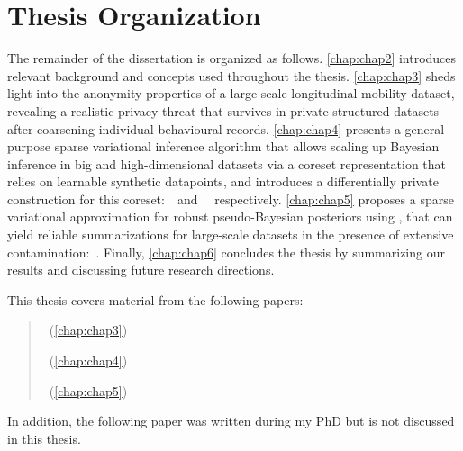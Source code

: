 \section{Thesis Organization}
\label{sec:thesis-organization}
The remainder of the dissertation is organized as follows. \cref{chap:chap2} introduces relevant background and concepts used throughout the thesis. \cref{chap:chap3} sheds light into the anonymity properties of a large-scale longitudinal mobility dataset, revealing a realistic privacy threat that survives in private structured datasets after coarsening individual behavioural records. \cref{chap:chap4} presents a general-purpose sparse variational inference algorithm that allows scaling up Bayesian inference in big and high-dimensional datasets via a coreset representation that relies on learnable synthetic datapoints, and introduces a differentially private construction for this coreset:~\psvi~and ~\dpsvi~respectively. \cref{chap:chap5} proposes a sparse variational approximation for robust pseudo-Bayesian posteriors using \bdiv, that can yield reliable summarizations for large-scale datasets in the presence of extensive contamination:~\bcores. Finally, \cref{chap:chap6} concludes the thesis by summarizing our results and discussing future research directions.


This thesis covers material from the following papers:

\begin{quote}
	~(\cref{chap:chap3})
	
	~(\cref{chap:chap4})
	
	~(\cref{chap:chap5})
\end{quote}


In addition, the following paper was written during my PhD but is not discussed in this thesis.

\begin{quote}
\end{quote}


